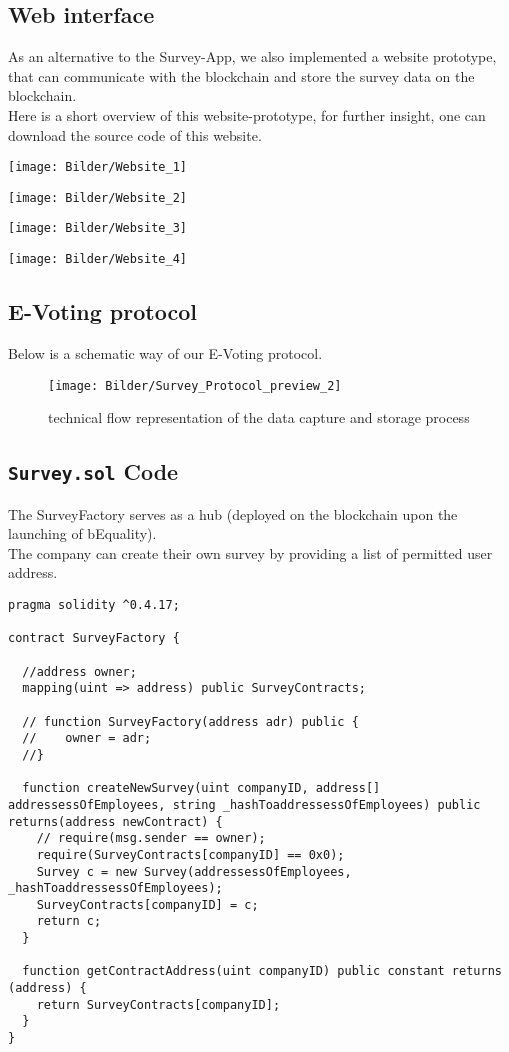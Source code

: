 \documentclass[portrait,a4paper]{article}
\begin{document}
	\subsection{Web interface}
		As an alternative to the Survey-App, we also implemented a website prototype, that can communicate with the blockchain
		and store the survey data on the blockchain.\\
		Here is a short overview of this website-prototype, for further insight, one can download the source code of this website.
		\begin{center}
			\texttt{[image: Bilder/Website\_1]}
		\end{center}
		\begin{center}
			\texttt{[image: Bilder/Website\_2]}
		\end{center}
		\begin{center}
			\texttt{[image: Bilder/Website\_3]}
		\end{center}
		\begin{center}
			\texttt{[image: Bilder/Website\_4]}
		\end{center}
	
	\subsection{E-Voting protocol}
		Below is a schematic way of our E-Voting protocol.
		\begin{figure}[H]
			\texttt{[image: Bilder/Survey\_Protocol\_preview\_2]}
			\caption{technical flow representation of the data capture and storage process}
			\label{technical_flow_representation}
		\end{figure}
	
	\subsection{\texttt{Survey.sol} Code}
		The SurveyFactory serves as a hub (deployed on the blockchain upon the launching of bEquality).\\
   		The company can create their own survey by providing a list of permitted user address.
   		\begin{lstlisting}
pragma solidity ^0.4.17;

contract SurveyFactory {

  //address owner;
  mapping(uint => address) public SurveyContracts;

  // function SurveyFactory(address adr) public {
  //    owner = adr;
  //}

  function createNewSurvey(uint companyID, address[] addressessOfEmployees, string _hashToaddressessOfEmployees) public returns(address newContract) {
    // require(msg.sender == owner);
    require(SurveyContracts[companyID] == 0x0);
    Survey c = new Survey(addressessOfEmployees, _hashToaddressessOfEmployees);
    SurveyContracts[companyID] = c;
    return c;
  }
  
  function getContractAddress(uint companyID) public constant returns (address) {
    return SurveyContracts[companyID];
  }
}
   		\end{lstlisting}
   		
\end{document}
